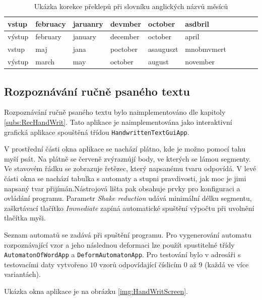 \documentclass[a4paper,10pt]{article}
\begin{document}
\begin{table}
 \centering
  \begin{tabular}{|l||l|l|l|l|l|l|l|l|l|}
    \hline
    vstup 	& februacy & jaruanry & devmber  & october & asdbril	\\\hline
    výstup 	& february & january  & december & october & april	\\\hline
    \hline
    vstup 	& maj   & jana & poctober & asauguszt  & mnobmvmert	\\\hline
    výstup	& march & may  & october  & august     & november	\\\hline
  \end{tabular}

 \caption{Ukázka korekce překlepů při slovníku anglických názvů měsíců} \label{tab:TyposOut}
\end{table}

\subsection{Rozpoznávání ručně psaného textu}
Rozpoznávání ručně psaného textu bylo naimplementováno dle kapitoly \ref{subs:RecHandWrit}. Tato aplikace je naimplementována jako interaktivní grafická aplikace spouštěná třídou \verb|HandwrittenTextGuiApp|. 

V prostřední části okna aplikace se nachází plátno, kde je možno pomocí tahu myší psát. Na plátně se červeně zvýraznůjí body, ve kterých se lámou segmenty. Ve stavovém řádku se zobrazuje řetězec, který napsanému tvaru odpovídá. V levé části okna se nachází tabulka s automaty a stupni pravdivosti, jak moc je jimi napsaný tvar přijímán.Nástrojová lišta pak obsahuje prvky pro konfiguraci a ovládání programu. Parametr \textit{Shake reduction} udává minimální délku segmentu, zaškrtávací tlačítko \textit{Immediate} zapíná automatické spuštění výpočtu při uvolnění tlačítka myši.

Seznam automatů se zadává při spuštění programu. Pro vygenerování automatu rozpoznávající vzor a jeho následnou deformaci lze použít spustitelné třídy \verb|AutomatonOfWordApp| a \verb|DeformAutomatonApp|. Pro testování bylo v adresáři s testovacími daty vytvořeno $10$ vzorů odpovídající číslicím $0$ až $9$ (každá ve více variantách). 

Ukázka okna aplikace je na obrázku \ref{img:HandWritScreen}.
\end{document}
